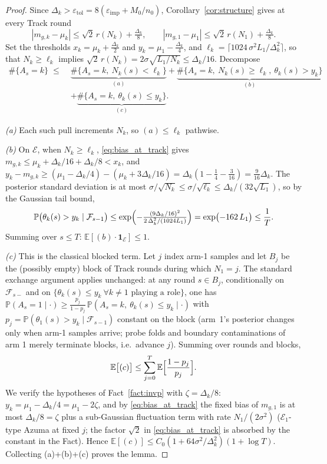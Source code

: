 \documentclass[11pt]{article}
\newcommand{\Fcal}{\mathcal F}
\newcommand{\Ecal}{\mathcal E}
\newcommand{\E}{\mathbb E}
\newcommand{\Pbb}{\mathbb P}
\newcommand{\one}{\mathbf 1}
\newcommand{\eimp}{\varepsilon_{\mathrm{imp}}}
\newcommand{\etol}{\varepsilon_{\mathrm{tol}}}
\begin{document}
\begin{proof}
Since $\Delta_k>\etol=8(\eimp+M_0/n_0)$, Corollary~\ref{cor:structure} gives at every Track round
\begin{equation}
    |m_{g,k}-\mu_k|\le\sqrt2\,r(N_k)+\tfrac{\Delta_k}{8},
    \qquad
    |m_{g,1}-\mu_1|\le\sqrt2\,r(N_1)+\tfrac{\Delta_k}{8}.
    \label{eq:bias_at_track}
\end{equation}
Set the thresholds $x_k=\mu_k+\tfrac{\Delta_k}{2}$ and $y_k=\mu_1-\tfrac{\Delta_k}{4}$, and
$\ell_k=\bigl\lceil 1024\,\sigma^2L_1/\Delta_k^2\bigr\rceil$, so that $N_k\ge\ell_k$ implies $\sqrt2\,r(N_k)=2\sigma\sqrt{L_1/N_k}\le\Delta_k/16$. Decompose
\begin{align*}
\#\{A_s=k\}
\;\le\;
&\underbrace{\#\{A_s=k,\ N_k(s)<\ell_k\}}_{(a)}
+\underbrace{\#\{A_s=k,\ N_k(s)\ge\ell_k,\ \theta_k(s)>y_k\}}_{(b)}\\
&+\underbrace{\#\{A_s=k,\ \theta_k(s)\le y_k\}}_{(c)} .
\end{align*}

\emph{(a)} Each such pull increments $N_k$, so $(a)\le\ell_k$ pathwise.

\emph{(b)} On $\Ecal$, when $N_k\ge\ell_k$, \eqref{eq:bias_at_track} gives $m_{g,k}\le\mu_k+\Delta_k/16+\Delta_k/8<x_k$, and
$y_k-m_{g,k}\ge(\mu_1-\Delta_k/4)-(\mu_k+3\Delta_k/16)=\Delta_k(1-\tfrac14-\tfrac3{16})=\tfrac{9}{16}\Delta_k$.
The posterior standard deviation is at most $\sigma/\sqrt{N_k}\le\sigma/\sqrt{\ell_k}\le\Delta_k/(32\sqrt{L_1})$, so by the Gaussian tail bound,
\[
\Pbb\bigl(\theta_k(s)>y_k\mid\Fcal_{s-1}\bigr)
\le\exp\Bigl(-\tfrac{(9\Delta_k/16)^2}{2\,\Delta_k^2/(1024L_1)}\Bigr)
=\exp\bigl(-162\,L_1\bigr)\le\frac1T .
\]
Summing over $s\le T$: $\E[(b)\cdot\one_\Ecal]\le1$.

\emph{(c)} This is the classical blocked term. Let $j$ index arm-1 samples and let $B_j$ be the (possibly empty) block of Track rounds during which $N_1=j$. The standard exchange argument \citep[Lemma~1]{AgrawalGoyal2013} applies unchanged: at any round $s\in B_j$, conditionally on $\Fcal_{s-}$ and on $\{\theta_k(s)\le y_k\ \forall k\ne1 \text{ playing a role}\}$, one has
$\Pbb(A_s=1\mid\cdot)\ge\frac{p_j}{1-p_j}\,\Pbb(A_s=k,\ \theta_k(s)\le y_k\mid\cdot)$
with $p_j=\Pbb(\theta_1(s)>y_k\mid\Fcal_{s-1})$ constant on the block (arm~1's posterior changes only when arm-1 samples arrive; probe folds and boundary contaminations of arm 1 merely terminate blocks, i.e.\ advance $j$). Summing over rounds and blocks,
\[
\E\bigl[(c)\bigr]\le\sum_{j=0}^{T}\E\Bigl[\frac{1-p_j}{p_j}\Bigr].
\]
We verify the hypotheses of Fact~\ref{fact:invp} with $\zeta=\Delta_k/8$: $y_k=\mu_1-\Delta_k/4=\mu_1-2\zeta$, and by \eqref{eq:bias_at_track} the fixed bias of $m_{g,1}$ is at most $\Delta_k/8=\zeta$ plus a sub-Gaussian fluctuation term with rate $N_1/(2\sigma^2)$ ($\Ecal_1$-type Azuma at fixed $j$; the factor $\sqrt2$ in \eqref{eq:bias_at_track} is absorbed by the constant in the Fact). Hence
$\E[(c)]\le C_0(1+64\sigma^2/\Delta_k^2)(1+\log T)$.
Collecting (a)+(b)+(c) proves the lemma.
\end{proof}
\end{document}
